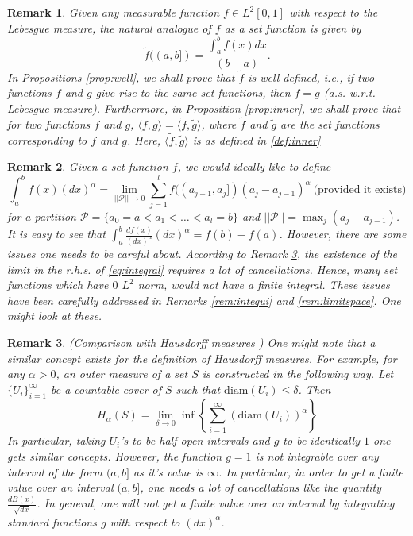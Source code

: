 \documentclass[reqno,12pt]{amsart}
\theoremstyle{plain}
\newtheorem{remark}{Remark}
\theoremstyle{definition}
\let\tilde\widetilde
\begin{document}
\begin{remark}\label{rem:measurable}
    Given any measurable function $f \in L^{2}[0,1]$ with respect to the Lebesgue measure, the natural analogue of $f$ as a set function is given by 
    \[
    \tilde{f}((a,b])= \frac{\int_{a}^{b} f(x) dx}{(b-a)}.
    \]
    In Propositions \ref{prop:well}, we shall prove that $\tilde{f}$ is well defined, i.e., if two functions $f$ and $g$ give rise to the same set functions, then $f=g$ (a.s. w.r.t. Lebesgue measure). Furthermore, in Proposition \ref{prop:inner}, we shall prove that for two functions $f$ and $g$, $\langle f,g \rangle= \langle \tilde{f}, \tilde{g} \rangle $, where $\tilde{f}$ and $\tilde{g}$ are the set functions corresponding to $f$ and $g$. Here, $\langle \tilde{f}, \tilde{g}\rangle$ is as defined in \eqref{def:inner}
   
\end{remark}
\begin{remark}
    Given a set function $f$, we would ideally like to define
    \begin{equation}\label{eq:integral}
    \int_{a}^{b} f(x) (dx)^{\alpha}= \lim_{||\mathcal{P}||\to 0} \sum_{j=1}^{l} f((a_{j-1},a_{j}])(a_{j}-a_{j-1})^{\alpha} ~\text{(provided it exists)}
    \end{equation}
    for a partition $\mathcal{P}= \{ a_{0}=a< a_{1}<\ldots<a_{l}=b\}$ and $||\mathcal{P}||= \max_{j}(a_{j}-a_{j-1})$. It is easy to see that $\int_{a}^{b} \frac{df(x)}{(dx)^{\alpha}} (dx)^{\alpha}= f(b)-f(a)$.
    However, there are some issues one needs to be careful about. According to Remark \ref{rem:hausdorff}, the existence of the limit in the r.h.s. of \eqref{eq:integral} requires a lot of cancellations. Hence, many set functions which have $0$ $L^2$ norm, would not have a finite integral. These issues have been carefully addressed in Remarks \ref{rem:intequi} and \ref{rem:limitspace}. One might look at these. 
\end{remark}
\begin{remark}\label{rem:hausdorff}(Comparison with Hausdorff measures )
One might note that a similar concept exists for the definition of Hausdorff measures. For example, for any $\alpha >0$, an outer measure of a set $S$ is constructed in the following way. Let $\{ U_i\}_{i=1}^{\infty}$ be a countable cover of $S$ such that $\mathrm{diam}(U_{i})\le \delta$. Then 
\[
H_{\alpha}(S)= \lim_{\delta \to 0} \inf \left\{ \sum_{i=1}^{\infty} \left( \mathrm{diam}(U_{i}) \right)^{\alpha}  \right\}
\] 
In particular, taking $U_{i}$'s to be half open intervals and $g$ to be identically $1$ one gets similar concepts. However, the function $g=1$ is not integrable over any interval of the form $(a,b]$ as it's value is $\infty$. In particular, in order to get a finite value over an interval $(a,b]$, one needs a lot of cancellations like the quantity $\frac{dB(x)}{\sqrt{dx}}$. In general, one will not get a finite value over an interval by integrating standard functions $g$ with respect to $(dx)^{\alpha}$.
\end{remark}
\end{document}
